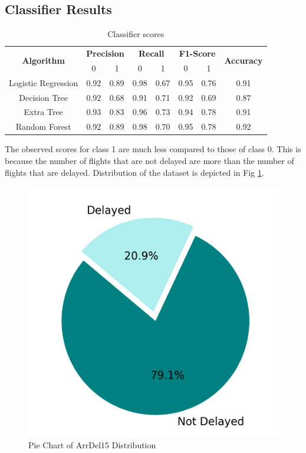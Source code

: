 \documentclass[12pt]{article}
\begin{document}
\subsection{ Classifier Results}
\begin{table}[H]
\begin{center}
\begin{tabular}{ |c|c|c|c|c|c|c|c| }
\hline
 \multirow{2}{*}{\textbf{Algorithm}} & \multicolumn{2}{c|}{\textbf{Precision}} & \multicolumn{2}{c|}{\textbf{Recall}} & \multicolumn{2}{c|}{\textbf{F1-Score}} & \multirow{2}{*}{\textbf{Accuracy}} \\
 \cline{2-7}
        & 0 & 1 & 0 & 1 & 0 & 1 & \\
\hline
 Logistic Regression &  0.92 & 0.89 & 0.98 & 0.67 & 0.95 & 0.76 & 0.91\\
 \hline
 Decision Tree &  0.92 & 0.68 & 0.91 & 0.71 & 0.92 & 0.69 &  0.87\\
 \hline
 Extra Tree &  0.93 & 0.83 & 0.96 & 0.73 & 0.94 & 0.78 & 0.91\\
 \hline
 Random Forest & 0.92 & 0.89 & 0.98 & 0.70 & 0.95 & 0.78 & 0.92\\
\hline
\end{tabular}
\caption{Classifier scores}
\label{Table 4}
\end{center}
\end{table}
The observed scores for class 1 are much less compared to those of class 0. This is because the number of flights that are not delayed are more than the number of flights that are delayed. Distribution of the dataset is depicted in Fig \ref{fig:1}. \\
\begin{figure}[H]
    \centering
    \includegraphics{Pie Chart of ArrDel15 Distribution.png}
    \caption{Pie Chart of ArrDel15 Distribution}
    \label{fig:1}
\end{figure}
\end{document}
